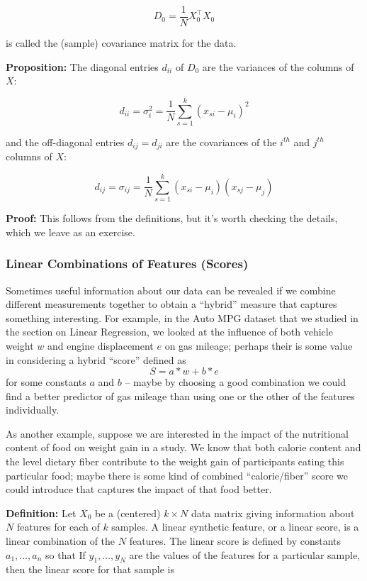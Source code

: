 \documentclass[]{article}
\begin{document}
\[
D_{0} = \frac{1}{N}X_{0}^{\intercal}X_{0}
\]

is called the (sample) covariance matrix for the data.

\textbf{Proposition:} The diagonal entries \(d_{ii}\) of \(D_{0}\) are
the variances of the columns of \(X\):

\[
d_{ii} = \sigma_{i}^2 = \frac{1}{N}\sum_{s=1}^{k}(x_{si}-\mu_i)^2
\]

and the off-diagonal entries \(d_{ij} = d_{ji}\) are the covariances of
the \(i^{th}\) and \(j^{th}\) columns of \(X\):

\[
d_{ij} = \sigma_{ij} = \frac{1}{N}\sum_{s=1}^{k}(x_{si}-\mu_{i})(x_{sj}-\mu_{j})
\]

\textbf{Proof:} This follows from the definitions, but it's worth
checking the details, which we leave as an exercise.

\hypertarget{linear-combinations-of-features-scores}{%
\subsubsection{Linear Combinations of Features
(Scores)}\label{linear-combinations-of-features-scores}}

Sometimes useful information about our data can be revealed if we
combine different measurements together to obtain a ``hybrid'' measure
that captures something interesting. For example, in the Auto MPG
dataset that we studied in the section on Linear Regression, we looked
at the influence of both vehicle weight \(w\) and engine displacement
\(e\) on gas mileage; perhaps their is some value in considering a
hybrid ``score'' defined as \[
S = a*w + b*e
\] for some constants \(a\) and \(b\) -- maybe by choosing a good
combination we could find a better predictor of gas mileage than using
one or the other of the features individually.

As another example, suppose we are interested in the impact of the
nutritional content of food on weight gain in a study. We know that both
calorie content and the level dietary fiber contribute to the weight
gain of participants eating this particular food; maybe there is some
kind of combined ``calorie/fiber'' score we could introduce that
captures the impact of that food better.

\textbf{Definition:} Let \(X_{0}\) be a (centered) \(k\times N\) data
matrix giving information about \(N\) features for each of \(k\)
samples. A linear synthetic feature, or a linear score, is a linear
combination of the \(N\) features. The linear score is defined by
constants \(a_{1},\ldots, a_{n}\) so that If \(y_{1},\ldots, y_{N}\) are
the values of the features for a particular sample, then the linear
score for that sample is
\end{document}
